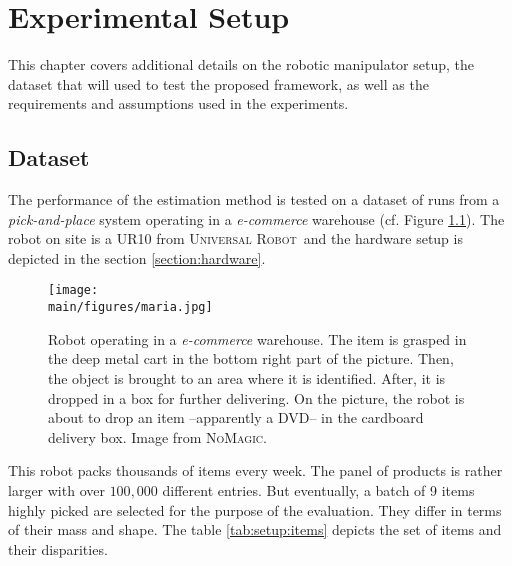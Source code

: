 \documentclass[/home/francois/latex/report/main.tex]{subfiles}
\begin{document}
\chapter{Experimental Setup}
\label{chapter:setup}

  This chapter covers additional details on the robotic manipulator setup, the dataset that will used to test the proposed framework, as well as the requirements and assumptions used in the experiments.

\section{Dataset}

The performance of the estimation method is tested on a dataset of runs from a \textit{pick-and-place} system operating in a \textit{e-commerce} warehouse (cf. Figure \ref{fig:setup:maria}). The robot on site is a UR10 from \textsc{Universal Robot}\texttrademark \ and the hardware setup is depicted in the section \ref{section:hardware}.

\begin{figure}[H]
  \centering
  \texttt{[image: \\main/figures/maria.jpg]}
  \caption{Robot operating in a \textit{e-commerce} warehouse. The item is grasped in the deep metal cart in the bottom right part of the picture. Then, the object is brought to an area where it is identified. After, it is dropped in a box for further delivering. On the picture, the robot is about to drop an item –apparently a DVD– in the cardboard delivery box. Image from \textsc{NoMagic}.}
  \label{fig:setup:maria}
\end{figure}

This robot packs thousands of items every week. The panel of products is rather larger with over $100{,}000$ different entries. But eventually, a batch of 9 items highly picked are selected for the purpose of the evaluation. They differ in terms of their mass and shape. The table \ref{tab:setup:items} depicts the set of items and their disparities.
\end{document}
